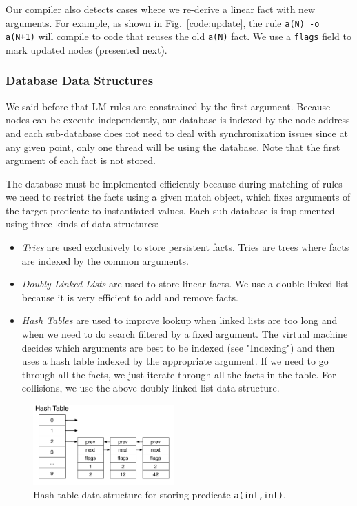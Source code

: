 Our compiler also detects cases where we re-derive a linear fact with new arguments.
For example, as shown in Fig.~\ref{code:update}, the rule \texttt{a(N) -o a(N+1)}
will compile to code that reuses the old \texttt{a(N)} fact.
We use a \texttt{flags} field to mark updated nodes (presented next).

\subsubsection{Database Data Structures}\label{sec:database}

We said before that LM rules are constrained by the first argument. Because nodes can be execute
independently, our database is indexed by the node address and each sub-database does not
need to deal with synchronization issues since at any given point, only one thread will be using
the database. Note that the first argument of each fact is not stored.

The database must be implemented efficiently because during matching of rules we need
to restrict the facts using a given match object, which fixes arguments of the target predicate to instantiated values.
Each sub-database is implemented using three kinds of data structures:

\begin{itemize}
   \item \emph{Tries} are used exclusively to store persistent facts.
   Tries are trees where facts are indexed by the common arguments.
      
   \item \emph{Doubly Linked Lists} are used to store linear facts.
   We use a double linked list because it is very efficient to add and remove facts.
   
   \item \emph{Hash Tables} are used to improve lookup when linked lists are too long and when we need to do search filtered by a fixed argument. The virtual machine decides which arguments are best to be indexed
   (see "Indexing") and then
   uses a hash table indexed by the appropriate argument. If we need to go through all the facts, we just iterate through all the facts in the table. For collisions, we use the above doubly linked list data structure.
\end{itemize}

\begin{figure}
   \vspace{-1\intextsep}
   \centering
   \includegraphics[width=0.48\textwidth]{hash_table.pdf}
   \caption{\small{Hash table data structure for storing predicate \texttt{a(int,int)}.}}
   \label{fig:hash_table}
   \vspace{-0.5\intextsep}
\end{figure}

